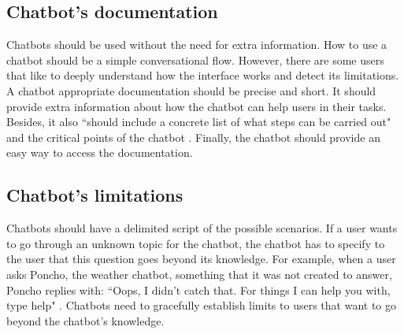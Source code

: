 \documentclass[a4paper,10pt]{article}
\begin{document}
\subsection*{Chatbot's documentation}

Chatbots should be used without the need for extra information. How to use a chatbot should be a simple conversational flow. However, there are some users that like to deeply understand how the interface works and detect its limitations. A chatbot appropriate documentation should be precise and short. It should provide extra information about how the chatbot can help users in their tasks. Besides, it also ``should include a concrete list of what steps can be carried out" and the critical points of the chatbot \cite{HeuristicsWebPage}. Finally, the chatbot should provide an easy way to access the documentation.   

\subsection*{Chatbot's limitations}

Chatbots should have a delimited script of the possible scenarios. If a user wants to go through an unknown topic for the chatbot, the chatbot has to specify to the user that this question goes beyond its knowledge. For example, when a user asks Poncho, the weather chatbot, something that it was not created to answer, Poncho replies with: ``Oops, I didn't catch that. For things I can help you with, type help" \cite{HeuristicsWebPage}. Chatbots need to gracefully establish limits to users that want to go beyond the chatbot's knowledge.  

\medskip


\end{document}
